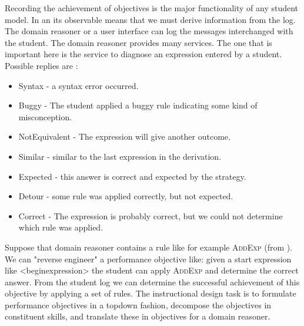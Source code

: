 Recording the achievement of objectives is the major functionality of any student model.
In an \gls{its} observable means that we must derive information from the log.
The domain reasoner or a user interface can log the messages interchanged with the student.
The domain reasoner provides many services. 
The one that is important here is the service to diagnose an expression entered by a student.
Possible replies are \citep{ideas1}:
 \begin{itemize}
\item Syntax - a syntax error occurred.
\item Buggy - The student applied a buggy rule indicating some kind of misconception.
\item NotEquivalent - The expression will give another outcome.
\item Similar - similar to the last expression in the derivation.
\item Expected - this answer is correct and expected by the strategy.
\item Detour - some rule was applied correctly, but not expected.
\item Correct - The expression is probably correct, but we could not determine which rule was applied.
\end{itemize}
Suppose that  domain reasoner contains a rule like for example  \textsc{AddExp} (from \cite{ideas1}).
We can "reverse engineer"  a performance objective like: given a start expression like {\textless}beginexpression{\textgreater} the student can apply \textsc{AddExp} 
and determine the correct answer.
From the student log we can determine the successful achievement of this objective by applying a set of rules.
The instructional design task is to formulate performance objectives in a topdown fashion, decompose the objectives in constituent skills, and translate these in objectives for a domain reasoner.


